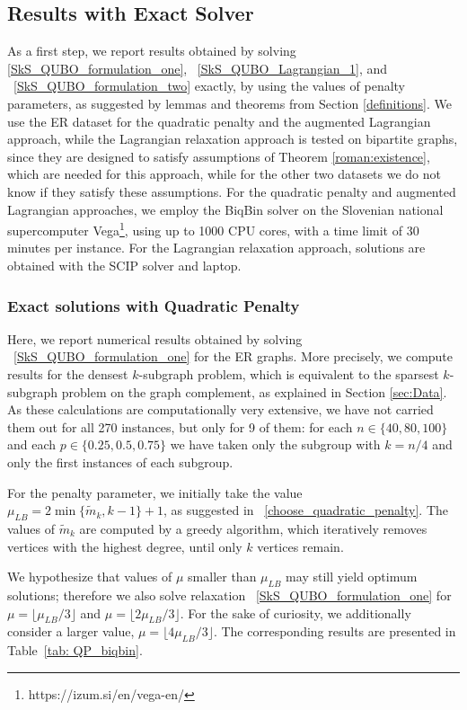 \documentclass{article}
\begin{document}
\subsection{Results with Exact Solver}\label{sec:exact_solvers}
As a first step, we report results obtained by solving 
\eqref{SkS_QUBO_formulation_one}, ~\eqref{SkS_QUBO_Lagrangian_1}, and ~\eqref{SkS_QUBO_formulation_two} exactly, by using the values of penalty parameters, as suggested by lemmas and theorems from Section \ref{definitions}.
We use the ER dataset for the quadratic penalty and the augmented Lagrangian approach, while the Lagrangian relaxation approach is tested on bipartite graphs, since they are designed to satisfy assumptions of Theorem \ref{roman:existence}, which are needed for this 
approach, while for the other two datasets we do not know if they satisfy these assumptions. 
For the quadratic penalty and augmented Lagrangian approaches, we employ the BiqBin solver \cite{gusmeroli2022biqbin} on the Slovenian national supercomputer Vega\footnote{https://izum.si/en/vega-en/}, using up to 1000 CPU cores,  with a time limit of 30 minutes per instance. For the Lagrangian relaxation approach, solutions are obtained with the SCIP solver \cite{SCIP} and laptop.


\subsubsection{Exact solutions with Quadratic Penalty}
Here, we report numerical results obtained by solving ~\eqref{SkS_QUBO_formulation_one} for the ER graphs. More precisely, we compute results for the densest $k$-subgraph problem, which is equivalent to the sparsest $k$-subgraph problem on the graph complement, as explained in Section \ref{sec:Data}. As these calculations are computationally very extensive, we have not carried them out for all 270 instances, but only for 9 of them: for each $n\in\{40,80,100\}$ and each $p\in\{0.25,0.5,0.75\}$ we have taken only the subgroup with $k=n/4$ and only the first instances of each subgroup. 

For the penalty parameter, we initially take the value
$\mu_{LB} = 2\min\{\tilde{m}_k,k-1\}+1$, as suggested in ~\eqref{choose_quadratic_penalty}.
The values of $\tilde{m}_k$ are computed by a greedy algorithm, which iteratively removes vertices with the highest degree, until only $k$ vertices remain.

We hypothesize that values of $\mu$ smaller than $\mu_{LB}$ may still yield optimum solutions; therefore we also solve relaxation  ~\eqref{SkS_QUBO_formulation_one} for $\mu = \lfloor \mu_{LB}/3 \rfloor$ and $\mu = \lfloor 2\mu_{LB}/3 \rfloor$.
For the sake of curiosity, we additionally consider a larger value, $\mu = \lfloor 4\mu_{LB}/3 \rfloor$. The corresponding results are presented in Table~\ref{tab: QP_biqbin}. 
\end{document}
